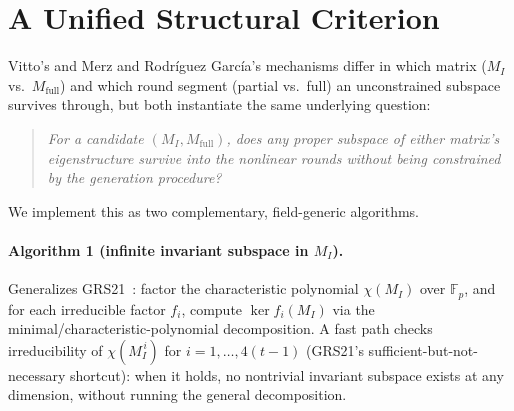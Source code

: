 \documentclass[11pt]{article}
\newcommand{\Fp}{\mathbb{F}_p}
\newcommand{\MI}{M_{I}}
\newcommand{\Mfull}{M_{\mathrm{full}}}
\begin{document}
\section{A Unified Structural Criterion}
\label{sec:criterion}

Vitto's and Merz and Rodr\'iguez Garc\'ia's mechanisms differ in which
matrix ($\MI$ vs.\ $\Mfull$) and which round segment (partial vs.\ full) an
unconstrained subspace survives through, but both instantiate the same
underlying question:

\begin{quote}
\emph{For a candidate $(\MI, \Mfull)$, does any proper subspace of either
matrix's eigenstructure survive into the nonlinear rounds without being
constrained by the generation procedure?}
\end{quote}

We implement this as two complementary, field-generic algorithms.

\paragraph{Algorithm 1 (infinite invariant subspace in $\MI$).}
Generalizes GRS21~\cite{grs21}: factor the characteristic polynomial
$\chi(\MI)$ over $\Fp$, and for each irreducible factor $f_i$, compute
$\ker f_i(\MI)$ via the minimal/characteristic-polynomial decomposition.
A fast path checks irreducibility of $\chi(\MI^{\,i})$ for
$i=1,\dots,4(t-1)$ (GRS21's sufficient-but-not-necessary shortcut): when it
holds, no nontrivial invariant subspace exists at any dimension, without
running the general decomposition.
\end{document}

